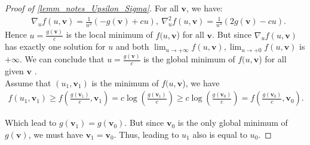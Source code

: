 \documentclass[10pt,a4paper]{amsart}
\def\evu{{u}}
\def\vv{{\bm{v}}}
\begin{document}
\begin{proof}[Proof of \cref{lemm_notes_Upsilon_Sigma}]
    For all $\vv$, we have:
    \begin{align*}
        &\nabla_u f(\evu,\vv)=\frac{1}{\evu^2}(-g(\vv)+cu),~\nabla^2_u f(\evu,\vv)=\frac{1}{\evu^3}(2g(\vv)-cu).
    \end{align*}
    Hence $\evu=\frac{g(\vv)}{c}$ is the local minimum of $f(\evu,\vv$) for all $\vv$. But since $\nabla_{\evu}f(\evu,\vv)$ has exactly one solution for $\evu$ and both $\displaystyle\lim_{\evu\rightarrow+\infty}f(\evu,\vv), \displaystyle\lim_{\evu\rightarrow+0}f(\evu,\vv)$ is $+\infty$. We can conclude that $\evu=\frac{g(\vv)}{c}$ is the global minimum of $f(\evu,\vv$) for all given $\vv$ .\\
    Assume that $(\evu_1,\vv_1)$ is the minimum of $f(\evu,\vv$), we have
    \begin{align*}
        f(\evu_1,\vv_1)\geq f\left(\frac{g(\vv_1)}{c},\vv_1\right)=c\log\left(\frac{g(\vv_1)}{c}\right) \geq c\log\left(\frac{g(\vv_0)}{c}\right)= f\left(\frac{g(\vv_0)}{c},\vv_0\right).
    \end{align*}
    \par Which lead to $g(\vv_1)=g(\vv_0)$. But since  $\vv_0$ is the only global minimum of $g(\vv)$, we must have $\vv_1=\vv_0$. Thus, leading to $\evu_1$ also is equal to $\evu_0$.
\end{proof}
\end{document}
